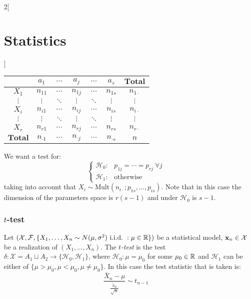 \documentclass[../../../main.tex]{subfiles}
\begin{document}
\begin{multicols}{2}[\section{Statistics}]
\begin{definition}
    \begin{center}
      \begin{minipage}{\linewidth}
        \centering
        \begin{tabular}{c|ccccc||c}
                           & $a_1$         & $\cdots$ & $a_j$         & $\cdots$ & $a_s$         & $\mathbf{Total}$ \\
          \hline
          $X_1$            & $n_{11}$      & $\cdots$ & $n_{1j}$      & $\cdots$ & $n_{1s}$      & $n_{1\cdot}$     \\
          $\vdots$         & $\vdots$      & $\ddots$ & $\vdots$      & $\ddots$ & $\vdots$      & $\vdots$         \\
          $X_i$            & $n_{i1}$      & $\cdots$ & $n_{ij}$      & $\cdots$ & $n_{is}$      & $n_{i\cdot}$     \\
          $\vdots$         & $\vdots$      & $\ddots$ & $\vdots$      & $\ddots$ & $\vdots$      & $\vdots$         \\
          $X_r$            & $n_{r1}$      & $\cdots$ & $n_{rj}$      & $\cdots$ & $n_{rs}$      & $n_{r\cdot}$     \\
          \hline\hline
          $\mathbf{Total}$ & $n_{\cdot 1}$ & $\cdots$ & $n_{\cdot j}$ & $\cdots$ & $n_{\cdot s}$ & $n$
        \end{tabular}
      \end{minipage}
    \end{center}
    We want a test for:
    $$
      \begin{cases}
        \mathcal{H}_0: & p_{1j}=\cdots=p_{rj}\ \forall j \\
        \mathcal{H}_1: & \text{otherwise}
      \end{cases}
    $$
    taking into account that $X_i\sim\text{Mult}(n_{i\cdot};p_{1s},\ldots,p_{is})$. Note that in this case the dimension of the parameters space is $r(s-1)$ and under $\mathcal{H}_0$ is $s-1$.
  \end{definition}
  \subsubsection{\texorpdfstring{$t$}{t}-test}
  \begin{definition}[$t$-test]
    Let $(\mathcal{X},\mathcal{F},\{X_1,\ldots,X_n\sim N(\mu,\sigma^2)\ \text{i.i.d.\ } : \mu\in\mathbb{R}\})$ be a statistical model, $\boldsymbol{\mathrm{x}}_n\in\mathcal{X}$ be a realization of $(X_1,\ldots,X_n)$. The \emph{$t$-test} is the test $\delta:\mathcal{X}=A_1\sqcup A_2\rightarrow\{\mathcal{H}_0,\mathcal{H}_1\}$, where $\mathcal{H}_0:\mu=\mu_0$ for some $\mu_0\in\mathbb{R}$ and $\mathcal{H}_1$ can be either of $\{\mu>\mu_0,\mu<\mu_0,\mu\ne\mu_0\}$. In this case the test statistic that is taken is: $$\frac{\overline{X}_n-\mu}{\frac{\tilde{s}_n}{\sqrt{n}}}\sim t_{n-1}$$
  \end{definition}

\end{multicols}
\end{document}
